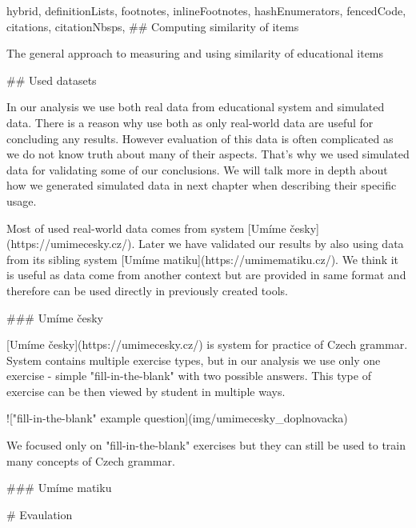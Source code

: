 \documentclass[
  digital, %
  table,   %
  nolof,     %
  nolot,     %
  nocover
]{fithesis3}
\begin{document}
\begin{markdown*}{%
  hybrid,
  definitionLists,
  footnotes,
  inlineFootnotes,
  hashEnumerators,
  fencedCode,
  citations,
  citationNbsps,
}
## Computing similarity of items

The general approach to measuring and using similarity of educational items

## Used datasets


In our analysis we use both real data from educational system and simulated data. There is a reason why use both as only real-world data are useful for concluding any results. However evaluation of this data is often complicated as we do not know truth about many of their aspects. That's why we used simulated data for validating some of our conclusions. We will talk more in depth about how we generated simulated data in next chapter when describing their specific usage.

Most of used real-world data comes from system [Umíme česky](https://umimecesky.cz/). Later we have validated our results by also using data from its sibling system [Umíme matiku](https://umimematiku.cz/). We think it is useful as data come from another context but are provided in same format and therefore can be used directly in previously created tools.

### Umíme česky

[Umíme česky](https://umimecesky.cz/) is system for practice of Czech grammar. System contains multiple exercise types, but in our analysis we use only one exercise - simple "fill-in-the-blank" with two possible answers. This type of exercise can be then viewed by student in multiple ways.

!["fill-in-the-blank" example question](img/umimecesky_doplnovacka)

We focused only on "fill-in-the-blank" exercises but they can still be used to train many concepts of Czech grammar.

### Umíme matiku


# Evaulation






\end{markdown*}
\end{document}
